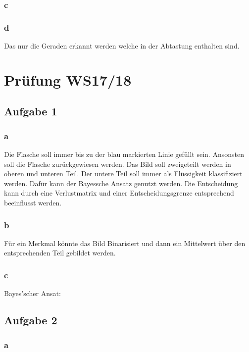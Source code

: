 \documentclass{article}
\begin{document}
	\subsubsection{c}
	
	\subsubsection{d}
	 Das nur die Geraden erkannt werden welche in der Abtastung enthalten sind.


\section{Prüfung WS17/18}

\subsection{Aufgabe 1}

	\subsubsection{a}
	Die Flasche soll immer bis zu der blau markierten Linie gefüllt sein. Ansonsten soll die Flasche zurückgewiesen werden. Das Bild soll zweigeteilt werden in oberen und unteren Teil. Der untere Teil soll immer als Flüssigkeit klassifiziert werden. Dafür kann der Bayessche Ansatz genutzt werden. Die Entscheidung kann durch eine Verlustmatrix und einer Entscheidungsgrenze entsprechend beeinflusst werden.
	
	\subsubsection{b}
	
	Für ein Merkmal könnte das Bild Binarisiert und dann ein Mittelwert über den entsprechenden Teil gebildet werden.

	\subsubsection{c}
	Bayes'scher Ansat: 

\subsection{Aufgabe 2}
	\subsubsection{a}
		\begin{figure}[h]
		\end{figure}
\end{document}
